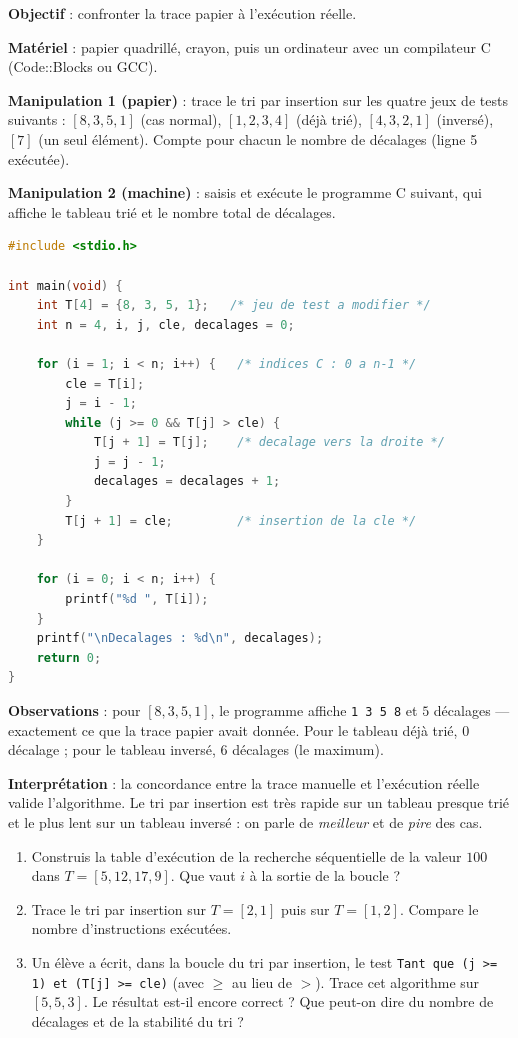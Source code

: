 \documentclass[11pt]{article}
\newcommand{\cle}[1]{{\popxbold\color{popdark}#1}}
\begin{document}
\begin{experience}
\textbf{Objectif} : confronter la trace papier à l'exécution réelle.

\textbf{Matériel} : papier quadrillé, crayon, puis un ordinateur avec un compilateur C (Code::Blocks ou GCC).

\textbf{Manipulation 1 (papier)} : trace le tri par insertion sur les quatre jeux de tests suivants : $[8, 3, 5, 1]$ (cas normal), $[1, 2, 3, 4]$ (déjà trié), $[4, 3, 2, 1]$ (inversé), $[7]$ (un seul élément). Compte pour chacun le nombre de décalages (ligne 5 exécutée).

\textbf{Manipulation 2 (machine)} : saisis et exécute le programme C suivant, qui affiche le tableau trié et le nombre total de décalages.

\begin{lstlisting}[language=C]
#include <stdio.h>

int main(void) {
    int T[4] = {8, 3, 5, 1};   /* jeu de test a modifier */
    int n = 4, i, j, cle, decalages = 0;

    for (i = 1; i < n; i++) {   /* indices C : 0 a n-1 */
        cle = T[i];
        j = i - 1;
        while (j >= 0 && T[j] > cle) {
            T[j + 1] = T[j];    /* decalage vers la droite */
            j = j - 1;
            decalages = decalages + 1;
        }
        T[j + 1] = cle;         /* insertion de la cle */
    }

    for (i = 0; i < n; i++) {
        printf("%d ", T[i]);
    }
    printf("\nDecalages : %d\n", decalages);
    return 0;
}
\end{lstlisting}

\textbf{Observations} : pour $[8, 3, 5, 1]$, le programme affiche \texttt{1 3 5 8} et $5$ décalages — exactement ce que la trace papier avait donnée. Pour le tableau déjà trié, $0$ décalage ; pour le tableau inversé, $6$ décalages (le maximum).

\textbf{Interprétation} : la concordance entre la trace manuelle et l'exécution réelle valide l'algorithme. Le tri par insertion est très rapide sur un tableau presque trié et le plus lent sur un tableau inversé : on parle de \emph{meilleur} et de \emph{pire} des cas.
\end{experience}

\begin{exercice}
\begin{enumerate}
\item Construis la table d'exécution de la recherche séquentielle de la valeur $100$ dans $T = [5, 12, 17, 9]$. Que vaut $i$ à la sortie de la boucle ?
\item Trace le tri par insertion sur $T = [2, 1]$ puis sur $T = [1, 2]$. Compare le nombre d'instructions exécutées.
\item Un élève a écrit, dans la boucle du tri par insertion, le test \texttt{Tant que (j >= 1) et (T[j] >= cle)} (avec $\ge$ au lieu de $>$). Trace cet algorithme sur $[5, 5, 3]$. Le résultat est-il encore correct ? Que peut-on dire du nombre de décalages et de la \cle{stabilité} du tri ?
\end{enumerate}
\end{exercice}
\end{document}
